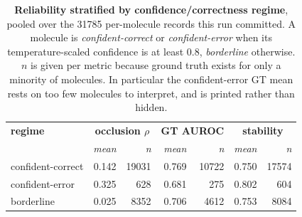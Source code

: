 \begin{table}[t]
\centering
\caption{\textbf{Reliability stratified by confidence/correctness regime}, pooled over the 31785 per-molecule records this run committed. A molecule is \emph{confident-correct} or \emph{confident-error} when its temperature-scaled confidence is at least $0.8$, \emph{borderline} otherwise. $n$ is given per metric because ground truth exists for only a minority of molecules. In particular the confident-error GT mean rests on too few molecules to interpret, and is printed rather than hidden.}
\label{tab:regime}
\footnotesize
\renewcommand{\arraystretch}{1.25}
\begin{tabular}{lrrrrrr}
\toprule
\textbf{regime} & \multicolumn{2}{c}{\textbf{occlusion $\rho$}} & \multicolumn{2}{c}{\textbf{GT AUROC}} & \multicolumn{2}{c}{\textbf{stability}} \\
 & \textit{mean} & \textit{n} & \textit{mean} & \textit{n} & \textit{mean} & \textit{n} \\
\midrule
confident-correct & 0.142 & 19031 & 0.769 & 10722 & 0.750 & 17574 \\
confident-error & 0.325 & 628 & 0.681 & 275 & 0.802 & 604 \\
borderline & 0.025 & 8352 & 0.706 & 4612 & 0.753 & 8084 \\
\bottomrule
\end{tabular}
\end{table}
